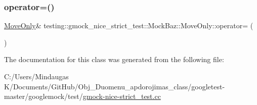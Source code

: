 \subsubsection{\texorpdfstring{operator=()}{operator=()}\hspace{0.1cm}{\footnotesize\ttfamily [4/4]}}
{\footnotesize\ttfamily \mbox{\hyperlink{classtesting_1_1gmock__nice__strict__test_1_1_mock_baz_1_1_move_only}{Move\+Only}}\& testing\+::gmock\+\_\+nice\+\_\+strict\+\_\+test\+::\+Mock\+Baz\+::\+Move\+Only\+::operator= (\begin{DoxyParamCaption}\item[{\mbox{\hyperlink{classtesting_1_1gmock__nice__strict__test_1_1_mock_baz_1_1_move_only}{Move\+Only}} \&\&}]{ }\end{DoxyParamCaption})\hspace{0.3cm}{\ttfamily [default]}}



The documentation for this class was generated from the following file\+:\begin{DoxyCompactItemize}
\item 
C\+:/\+Users/\+Mindaugas K/\+Documents/\+Git\+Hub/\+Obj\+\_\+\+Duomenu\+\_\+apdorojimas\+\_\+class/googletest-\/master/googlemock/test/\mbox{\hyperlink{googletest-master_2googlemock_2test_2gmock-nice-strict__test_8cc}{gmock-\/nice-\/strict\+\_\+test.\+cc}}\end{DoxyCompactItemize}
